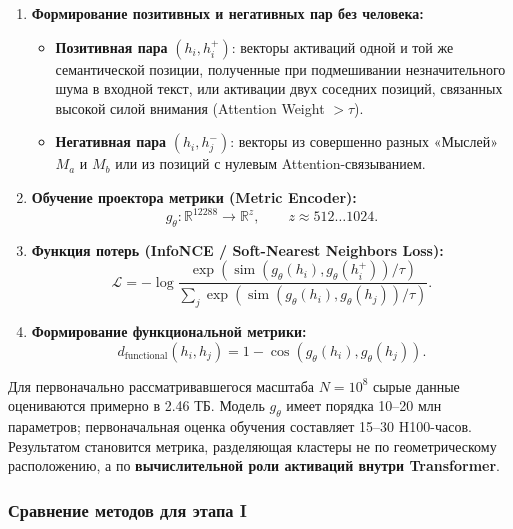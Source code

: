 \documentclass[11pt,a4paper]{article}
\begin{document}
\begin{enumerate}
    \item \textbf{Формирование позитивных и негативных пар без человека:}
    \begin{itemize}
        \item \textbf{Позитивная пара} $(h_i,h_i^+)$: векторы активаций одной и той же семантической позиции, полученные при подмешивании незначительного шума в входной текст, или активации двух соседних позиций, связанных высокой силой внимания (Attention Weight $>\tau$).
        \item \textbf{Негативная пара} $(h_i,h_j^-)$: векторы из совершенно разных «Мыслей» $M_a$ и $M_b$ или из позиций с нулевым Attention-связыванием.
    \end{itemize}
    \item \textbf{Обучение проектора метрики (Metric Encoder):}
    \[
    g_\theta:\mathbb{R}^{12288}\rightarrow\mathbb{R}^{z},
    \qquad z\approx512\ldots1024.
    \]
    \item \textbf{Функция потерь (InfoNCE / Soft-Nearest Neighbors Loss):}
    \[
    \mathcal{L}
    =-\log
    \frac{\exp\left(\operatorname{sim}(g_\theta(h_i),g_\theta(h_i^+))/\tau\right)}
    {\sum_j\exp\left(\operatorname{sim}(g_\theta(h_i),g_\theta(h_j))/\tau\right)}.
    \]
    \item \textbf{Формирование функциональной метрики:}
    \[
    d_{\text{functional}}(h_i,h_j)
    =1-\cos\left(g_\theta(h_i),g_\theta(h_j)\right).
    \]
\end{enumerate}

Для первоначально рассматривавшегося масштаба $N=10^8$ сырые данные оцениваются примерно в 2.46 ТБ. Модель $g_\theta$ имеет порядка 10--20 млн параметров; первоначальная оценка обучения составляет 15--30 H100-часов. Результатом становится метрика, разделяющая кластеры не по геометрическому расположению, а по \textbf{вычислительной роли активаций внутри Transformer}.

\subsubsection*{Сравнение методов для этапа I}
\end{document}
